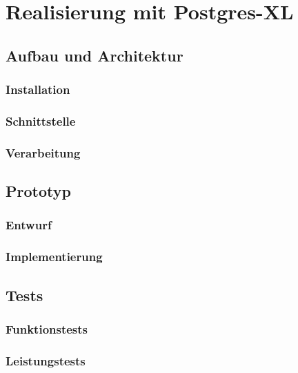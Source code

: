 \chapter{Realisierung mit Postgres-XL}
\label{chapter:postgresxl}

\section{Aufbau und Architektur}

\subsection{Installation}

\subsection{Schnittstelle}

\subsection{Verarbeitung}


\section{Prototyp}

\subsection{Entwurf}

\subsection{Implementierung}


\section{Tests}

\subsection{Funktionstests}

\subsection{Leistungstests}
